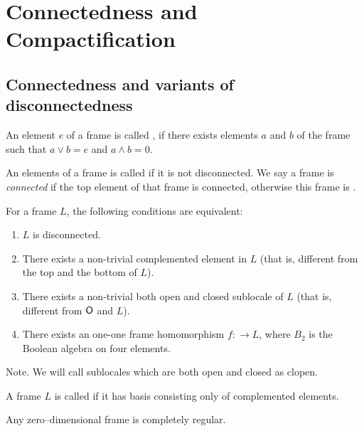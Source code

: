 \chapter{Connectedness and Compactification}

\section{Connectedness and variants of disconnectedness}
\begin{definition}
    An element $e$ of a frame is called , if there exists elements $a$ and $b$ of the frame such that $a\vee b = e$ and $a\wedge b = 0$.

    An elements of a frame is called  if it is not disconnected. We say a frame is \emph{connected} if the top element of that frame is connected, otherwise this frame is .
\end{definition}

\begin{observation}\label{p:disconnectednessEquivalently}
    For a frame $L$, the following conditions are equivalent:

    \begin{enumerate}
        \item $L$ is disconnected.
        \item There exists a non-trivial complemented element in $L$ (that is, different from the top and the bottom of $L$).
        \item There exists a non-trivial both open and closed sublocale of $L$ (that is, different from $\mathsf{O}$ and $L$).
        \item There exists an one-one frame homomorphism $f\colon $$ \to L$, where $B_2$ is the Boolean algebra on four elements.
    \end{enumerate}
\end{observation}

\begin{block*}{Note.}
    We will call sublocales which are both open and closed as clopen.
\end{block*}

\begin{definition}
    A frame $L$ is called  if it has basis consisting only of complemented elements.
\end{definition}

\begin{observation}
    Any zero--dimensional frame is completely regular.
\end{observation}

